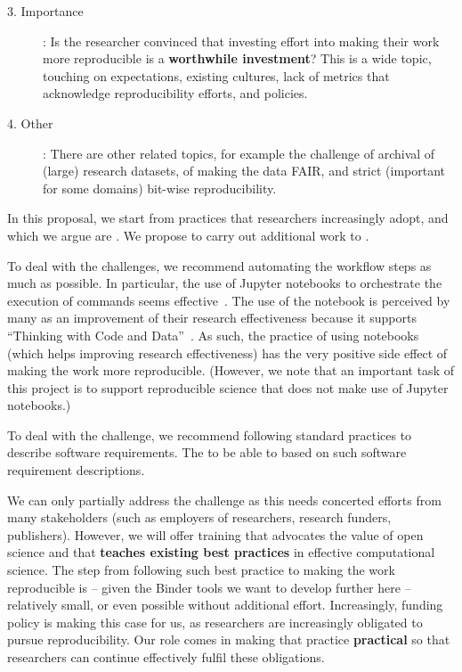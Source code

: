 \begin{description}
\item[3. Importance]: Is the researcher convinced that investing effort into making
their work more reproducible is a \textbf{worthwhile investment}? This is a wide topic,
touching on expectations, existing cultures, lack of metrics that acknowledge
reproducibility efforts, and policies.

\item[4. Other]: There are other related topics, for example the challenge of
archival of (large) research datasets, of making the data FAIR, and strict
(important for some domains) bit-wise reproducibility.
\end{description}

In this proposal, we start from practices that researchers increasingly adopt,
and which we argue are . We propose to carry
out additional work to .\medskip

To deal with the  challenges, we recommend automating the
workflow steps as much as possible. In particular, the use of Jupyter notebooks
to orchestrate the execution of commands seems effective~\cite{Beg2021}.
The use of the notebook is
perceived by many as an improvement of their research effectiveness because
it supports ``Thinking with Code and Data''~\cite{Granger2021}. As such, the
practice of using notebooks (which helps improving research effectiveness) has
the very positive side effect of making the work more reproducible. (However, we
note that an important task of this project is to support reproducible science
that does not make use of Jupyter notebooks.)\medskip

To deal with the  challenge, we recommend following
standard practices to describe software requirements. The  to be able to
 based on such software
requirement descriptions.\medskip

We can only partially address the  challenge as this needs
concerted efforts from many stakeholders (such as employers of researchers,
research funders, publishers). However, we will offer training that advocates
the value of open science and that \textbf{teaches existing best practices} in
effective computational science. The step from following such best practice to
making the work reproducible is -- given the Binder tools we want to develop
further here -- relatively small, or even possible without additional effort.
Increasingly, funding policy is making this case for us,
as researchers are increasingly obligated to pursue reproducibility.
Our role comes in making that practice \textbf{practical}
so that researchers can continue effectively fulfil these obligations.\medskip

